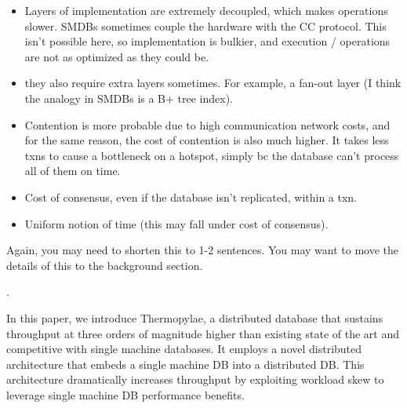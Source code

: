 {\begin{itemize}
\begin{itemize}
        \item Layers of implementation are extremely decoupled, which makes operations slower. SMDBs sometimes couple the hardware with the CC protocol. This isn't possible here, so implementation is bulkier, and execution / operations are not as optimized as they could be.
        \item they also require extra layers sometimes. For example, a fan-out layer (I think the analogy in SMDBs is a B+ tree index).
        \item Contention is more probable due to high communication network costs, and for the same reason, the cost of contention is also much higher. It takes less txns to cause a bottleneck on a hotspot, simply bc the database can't process all of them on time.
        \item Cost of consensus, even if the database isn't replicated, within a txn.
        \item Uniform notion of time (this may fall under cost of consensus).
    \end{itemize}
    Again, you may need to shorten this to 1-2 sentences. You may want to move the details of this to the background section.
\end{itemize}.}

 

 In this paper, we introduce Thermopylae, a distributed database that sustains throughput at three orders of magnitude higher than existing state of the art and competitive  with single machine databases. It employs a novel distributed architecture that embeds a single machine DB into a distributed DB. This architecture dramatically increases throughput by exploiting workload skew to leverage single machine DB performance benefits.

